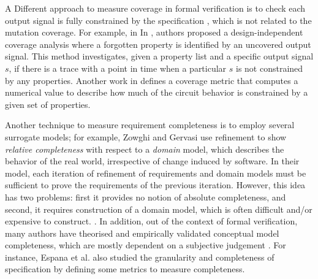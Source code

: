 A Different approach to measure coverage in formal verification is to check each output signal is fully constrained by the specification \cite{das2005formal, claessen2007coverage, grosse2007estimating}, which is not related to the mutation coverage. For example, in In \cite{claessen2007coverage}, authors proposed a design-independent coverage analysis where a forgotten property is identified by an uncovered output signal. This method investigates, given a property list and a specific output signal $s$, if there is a trace with a point in time when a particular $s$ is not constrained by any properties. Another work in \cite{haedicke2012guiding} defines a coverage metric that computes a numerical value to describe how much of the circuit behavior is constrained by a given set of properties.


Another technique to measure requirement completeness is to employ several surrogate models; for example, Zowghi and Gervasi use refinement to show {\em relative completeness} with respect to a {\em domain} model, which describes the behavior of the real world, irrespective of change induced by software.  In their model, each iteration of refinement of requirements and domain models must be sufficient to prove the requirements of the previous iteration.  However, this idea has two problems: first it provides no notion of absolute completeness, and second, it requires construction of a domain model, which is often difficult and/or expensive to construct. . In addition, out of the context of formal verification, many authors have theorised and empirically validated conceptual model completeness, which are mostly dependent on a subjective judgement \cite{drechsler2012completeness, firesmith2005your, chang2007finding,katta2013investigating, zowghi2002three}. For instance, Espana et al. \cite{espana2009evaluating} also studied the granularity and completeness of specification by defining some metrics to measure completeness.

%

%


